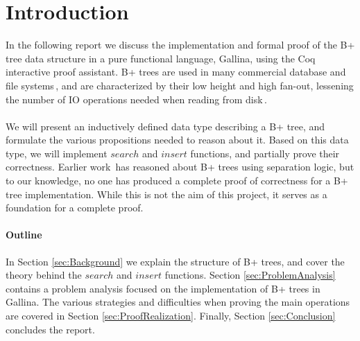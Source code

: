 \section{Introduction}
\label{sec:Introduction}
In the following report we discuss the implementation and formal proof of the B+ tree data structure in a pure functional language, Gallina, using the Coq interactive proof assistant. B+ trees are used in many commercial database and file systems\,\cite[p. 359]{ramakrishnan2003database}, and are characterized by their low height and high fan-out, lessening the number of IO operations needed when reading from disk\,\cite[pp. 344]{ramakrishnan2003database}.
\paragraph{}
We will present an inductively defined data type describing a B+ tree, and formulate the various propositions needed to reason about it. Based on this data type, we will implement $search$ and $insert$ functions, and partially prove their correctness. Earlier work\,\cite{sexton2008reasoning} has reasoned about B+ trees using separation logic, but to our knowledge, no one has produced a complete proof of correctness for a B+ tree implementation. While this is not the aim of this project, it serves as a foundation for a complete proof.
\paragraph{Outline}
In Section \ref{sec:Background} we explain the structure of B+ trees, and cover the theory behind the $search$ and $insert$ functions. Section \ref{sec:ProblemAnalysis} contains a problem analysis focused on the implementation of B+ trees in Gallina. The various strategies and difficulties when proving the main operations are covered in Section \ref{sec:ProofRealization}. Finally, Section \ref{sec:Conclusion} concludes the report.
